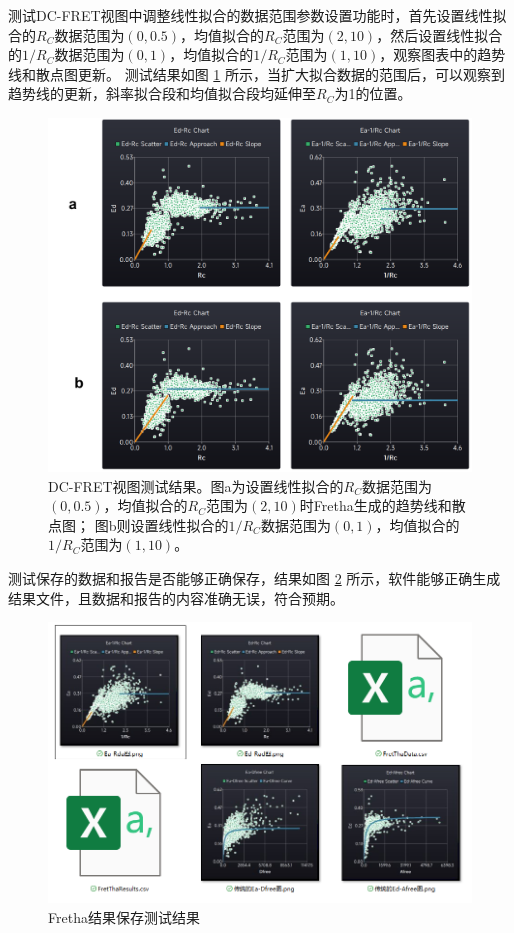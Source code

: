 测试DC-FRET视图中调整线性拟合的数据范围参数设置功能时，首先设置线性拟合的$R_C$数据范围为$(0,0.5)$，均值拟合的$R_C$范围为$(2,10)$，然后设置线性拟合的$1/R_C$数据范围为$(0,1)$，均值拟合的$1/R_C$范围为$(1,10)$，观察图表中的趋势线和散点图更新。
测试结果如图 \ref{fig:DC-FRET视图测试} 所示，当扩大拟合数据的范围后，可以观察到趋势线的更新，斜率拟合段和均值拟合段均延伸至$R_C$为1的位置。
\begin{figure}
  \centering
  \includegraphics[width=0.9\linewidth]{../figures/4/4_DC-FRET参数测试.png}
  \caption[Fretha DC-FRET视图测试结果]{DC-FRET视图测试结果。图a为设置线性拟合的$R_C$数据范围为$(0,0.5)$，均值拟合的$R_C$范围为$(2,10)$时Fretha生成的趋势线和散点图；
  图b则设置线性拟合的$1/R_C$数据范围为$(0,1)$，均值拟合的$1/R_C$范围为$(1,10)$。}
  \label{fig:DC-FRET视图测试}
\end{figure}

测试保存的数据和报告是否能够正确保存，结果如图 \ref{fig:结果保存测试} 所示，软件能够正确生成结果文件，且数据和报告的内容准确无误，符合预期。
\begin{figure}[hbtp]
  \centering
  \includegraphics[width=0.6\linewidth]{../figures/2/2_保存数据.png}
  \caption{Fretha结果保存测试结果}
  \label{fig:结果保存测试}
\end{figure}

